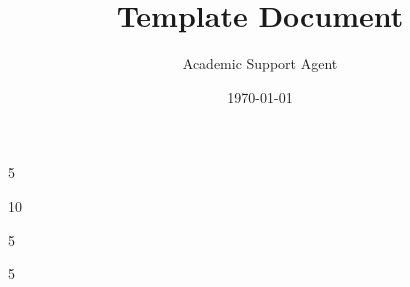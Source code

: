\documentclass{article}
\title{Template Document}
\author{Academic Support Agent}
\date{\today}
\begin{document}
\maketitle

\generalinstructions %

\questionPreamble  %

\begin{question}{5}  %

\end{question}

\begin{question}{10} %

\end{question}

\begin{question}{5}

\end{question}

\begin{question}{5}

\end{question}


\questionEnding %
\end{document}
